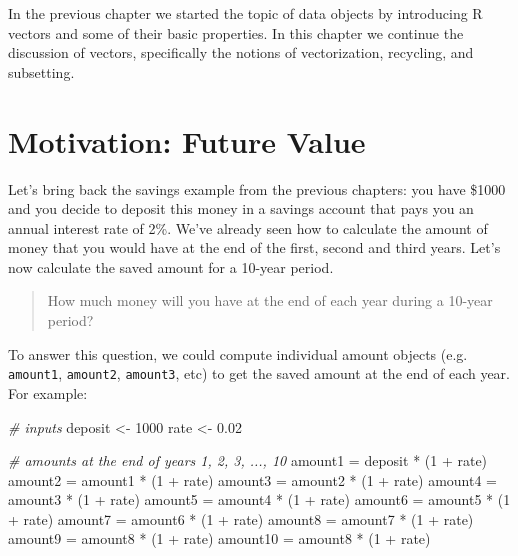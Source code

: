 \documentclass[
]{book}
\newenvironment{Shaded}{\begin{snugshade}}{\end{snugshade}}
\newcommand{\CommentTok}[1]{\textcolor[rgb]{0.56,0.35,0.01}{\textit{#1}}}
\newcommand{\DecValTok}[1]{\textcolor[rgb]{0.00,0.00,0.81}{#1}}
\newcommand{\FloatTok}[1]{\textcolor[rgb]{0.00,0.00,0.81}{#1}}
\newcommand{\NormalTok}[1]{#1}
\newcommand{\OtherTok}[1]{\textcolor[rgb]{0.56,0.35,0.01}{#1}}
\newcommand{\SpecialCharTok}[1]{\textcolor[rgb]{0.00,0.00,0.00}{#1}}
\begin{document}
In the previous chapter we started the topic of data objects by introducing
R vectors and some of their basic properties. In this chapter we continue the
discussion of vectors, specifically the notions of vectorization, recycling,
and subsetting.

\hypertarget{motivation-future-value}{%
\section{Motivation: Future Value}\label{motivation-future-value}}

Let's bring back the savings example from the previous chapters: you have \$1000
and you decide to deposit this money in a savings account that pays you an
annual interest rate of 2\%. We've already seen how to calculate the amount of
money that you would have at the end of the first, second and third years. Let's
now calculate the saved amount for a 10-year period.

\begin{quote}
How much money will you have at the end of each year during a 10-year period?
\end{quote}

To answer this question, we could compute individual amount objects (e.g.~
\texttt{amount1}, \texttt{amount2}, \texttt{amount3}, etc) to get the saved amount at the end of
each year. For example:

\begin{Shaded}
\begin{Highlighting}[]
\CommentTok{\# inputs}
\NormalTok{deposit }\OtherTok{\textless{}{-}} \DecValTok{1000}
\NormalTok{rate }\OtherTok{\textless{}{-}} \FloatTok{0.02}

\CommentTok{\# amounts at the end of years 1, 2, 3, ..., 10}
\NormalTok{amount1 }\OtherTok{=}\NormalTok{ deposit }\SpecialCharTok{*}\NormalTok{ (}\DecValTok{1} \SpecialCharTok{+}\NormalTok{ rate)}
\NormalTok{amount2 }\OtherTok{=}\NormalTok{ amount1 }\SpecialCharTok{*}\NormalTok{ (}\DecValTok{1} \SpecialCharTok{+}\NormalTok{ rate)}
\NormalTok{amount3 }\OtherTok{=}\NormalTok{ amount2 }\SpecialCharTok{*}\NormalTok{ (}\DecValTok{1} \SpecialCharTok{+}\NormalTok{ rate)}
\NormalTok{amount4 }\OtherTok{=}\NormalTok{ amount3 }\SpecialCharTok{*}\NormalTok{ (}\DecValTok{1} \SpecialCharTok{+}\NormalTok{ rate)}
\NormalTok{amount5 }\OtherTok{=}\NormalTok{ amount4 }\SpecialCharTok{*}\NormalTok{ (}\DecValTok{1} \SpecialCharTok{+}\NormalTok{ rate)}
\NormalTok{amount6 }\OtherTok{=}\NormalTok{ amount5 }\SpecialCharTok{*}\NormalTok{ (}\DecValTok{1} \SpecialCharTok{+}\NormalTok{ rate)}
\NormalTok{amount7 }\OtherTok{=}\NormalTok{ amount6 }\SpecialCharTok{*}\NormalTok{ (}\DecValTok{1} \SpecialCharTok{+}\NormalTok{ rate)}
\NormalTok{amount8 }\OtherTok{=}\NormalTok{ amount7 }\SpecialCharTok{*}\NormalTok{ (}\DecValTok{1} \SpecialCharTok{+}\NormalTok{ rate)}
\NormalTok{amount9 }\OtherTok{=}\NormalTok{ amount8 }\SpecialCharTok{*}\NormalTok{ (}\DecValTok{1} \SpecialCharTok{+}\NormalTok{ rate)}
\NormalTok{amount10 }\OtherTok{=}\NormalTok{ amount8 }\SpecialCharTok{*}\NormalTok{ (}\DecValTok{1} \SpecialCharTok{+}\NormalTok{ rate)}
\end{Highlighting}
\end{Shaded}
\end{document}
